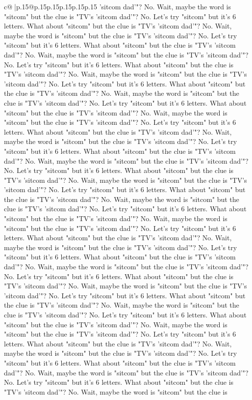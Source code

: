 \documentclass{article}
\begin{document}
{\begin{supertabular}{c@{$\;$}|p{.15\linewidth}@{}p{.15\linewidth}p{.15\linewidth}p{.15\linewidth}p{.15\linewidth}p{.15\linewidth}}
{{{'sitcom dad'"? No. Wait, maybe the word is "sitcom" but the clue is "TV's 'sitcom dad'"? No. Let's try "sitcom" but it's 6 letters. What about "sitcom" but the clue is "TV's 'sitcom dad'"? No. Wait, maybe the word is "sitcom" but the clue is "TV's 'sitcom dad'"? No. Let's try "sitcom" but it's 6 letters. What about "sitcom" but the clue is "TV's 'sitcom dad'"? No. Wait, maybe the word is "sitcom" but the clue is "TV's 'sitcom dad'"? No. Let's try "sitcom" but it's 6 letters. What about "sitcom" but the clue is "TV's 'sitcom dad'"? No. Wait, maybe the word is "sitcom" but the clue is "TV's 'sitcom dad'"? No. Let's try "sitcom" but it's 6 letters. What about "sitcom" but the clue is "TV's 'sitcom dad'"? No. Wait, maybe the word is "sitcom" but the clue is "TV's 'sitcom dad'"? No. Let's try "sitcom" but it's 6 letters. What about "sitcom" but the clue is "TV's 'sitcom dad'"? No. Wait, maybe the word is "sitcom" but the clue is "TV's 'sitcom dad'"? No. Let's try "sitcom" but it's 6 letters. What about "sitcom" but the clue is "TV's 'sitcom dad'"? No. Wait, maybe the word is "sitcom" but the clue is "TV's 'sitcom dad'"? No. Let's try "sitcom" but it's 6 letters. What about "sitcom" but the clue is "TV's 'sitcom dad'"? No. Wait, maybe the word is "sitcom" but the clue is "TV's 'sitcom dad'"? No. Let's try "sitcom" but it's 6 letters. What about "sitcom" but the clue is "TV's 'sitcom dad'"? No. Wait, maybe the word is "sitcom" but the clue is "TV's 'sitcom dad'"? No. Let's try "sitcom" but it's 6 letters. What about "sitcom" but the clue is "TV's 'sitcom dad'"? No. Wait, maybe the word is "sitcom" but the clue is "TV's 'sitcom dad'"? No. Let's try "sitcom" but it's 6 letters. What about "sitcom" but the clue is "TV's 'sitcom dad'"? No. Wait, maybe the word is "sitcom" but the clue is "TV's 'sitcom dad'"? No. Let's try "sitcom" but it's 6 letters. What about "sitcom" but the clue is "TV's 'sitcom dad'"? No. Wait, maybe the word is "sitcom" but the clue is "TV's 'sitcom dad'"? No. Let's try "sitcom" but it's 6 letters. What about "sitcom" but the clue is "TV's 'sitcom dad'"? No. Wait, maybe the word is "sitcom" but the clue is "TV's 'sitcom dad'"? No. Let's try "sitcom" but it's 6 letters. What about "sitcom" but the clue is "TV's 'sitcom dad'"? No. Wait, maybe the word is "sitcom" but the clue is "TV's 'sitcom dad'"? No. Let's try "sitcom" but it's 6 letters. What about "sitcom" but the clue is "TV's 'sitcom dad'"? No. Wait, maybe the word is "sitcom" but the clue is "TV's 'sitcom dad'"? No. Let's try "sitcom" but it's 6 letters. What about "sitcom" but the clue is "TV's 'sitcom dad'"? No. Wait, maybe the word is "sitcom" but the clue is "TV's 'sitcom dad'"? No. Let's try "sitcom" but it's 6 letters. What about "sitcom" but the clue is "TV's 'sitcom dad'"? No. Wait, maybe the word is "sitcom" but the clue is "TV's 'sitcom dad'"? No. Let's try "sitcom" but it's 6 letters. What about "sitcom" but the clue is "TV's 'sitcom dad'"? No. Wait, maybe the word is "sitcom" but the clue is "TV's 'sitcom dad'"? No. Let's try "sitcom" but it's 6 letters. What about "sitcom" but the clue is "TV's 'sitcom dad'"? No. Wait, maybe the word is "sitcom" but the clue is }}}
\end{supertabular}}
\end{document}
